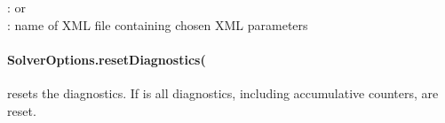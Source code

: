 :   or \\
:  name of XML file containing chosen XML parameters\\


\paragraph{SolverOptions.resetDiagnostics(
}
resets the diagnostics. If  is \True all diagnostics, including
accumulative counters, are reset.


